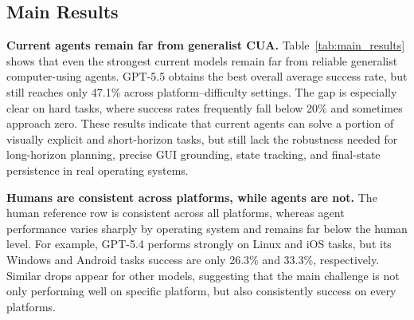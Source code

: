 \subsection{Main Results}

\noindent
\textbf{Current agents remain far from generalist CUA.}
Table~\ref{tab:main_results} shows that even the strongest current models remain far from reliable generalist computer-using agents. GPT-5.5 obtains the best overall average success rate, but still reaches only 47.1\% across platform--difficulty settings. The gap is especially clear on hard tasks, where success rates frequently fall below 20\% and sometimes approach zero. These results indicate that current agents can solve a portion of visually explicit and short-horizon tasks, but still lack the robustness needed for long-horizon planning, precise GUI grounding, state tracking, and final-state persistence in real operating systems.

\noindent
\textbf{Humans are consistent across platforms, while agents are not.}
The human reference row is consistent across all platforms, whereas agent performance varies sharply by operating system and remains far below the human level. For example, GPT-5.4 performs strongly on Linux and iOS tasks, but its Windows and Android tasks success are only 26.3\% and 33.3\%, respectively. Similar drops appear for other models, suggesting that the main challenge is not only performing well on specific platform, but also consistently success on every platforms.



